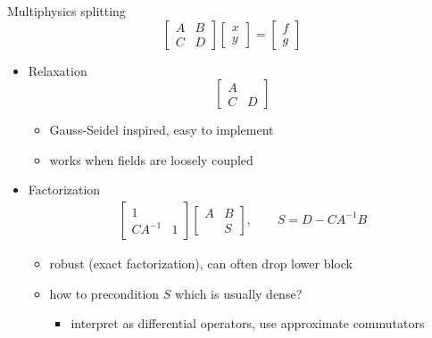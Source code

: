 \begin{frame}{Multiphysics splitting}
  \begin{equation*}
    \begin{bmatrix}
      A & B \\ C & D
    \end{bmatrix}
    \begin{bmatrix}
      x \\ y
    \end{bmatrix}
    =
    \begin{bmatrix}
      f \\ g
    \end{bmatrix}
  \end{equation*}
  \begin{itemize}\item Relaxation
    \begin{equation*}
      \begin{bmatrix}
        A & \\ C & D
      \end{bmatrix}
    \end{equation*}
    \begin{itemize}
    \item Gauss-Seidel inspired, easy to implement
    \item works when fields are loosely coupled
    \end{itemize}
  \item Factorization
    \begin{align*}
      \begin{bmatrix}
        1 & \\ CA^{-1} & 1
      \end{bmatrix}
      \begin{bmatrix}
        A & B \\ & S
      \end{bmatrix}, \qquad
      S = D - C A^{-1} B
    \end{align*}
    \begin{itemize}
    \item robust (exact factorization), can often drop lower block
    \item how to precondition $S$ which is usually dense?
      \begin{itemize}
      \item interpret as differential operators, use approximate commutators
      \end{itemize}
    \end{itemize}
  \end{itemize}
\end{frame}
